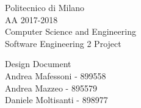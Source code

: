
\usepackage{graphicx}
\usepackage{listings}
\usepackage{algpseudocode}
\renewcommand\textfraction{.1}
\usepackage{booktabs}

	
	
	\begin{titlepage}
		
		\begin{figure}[t]
			\centering
		\end{figure}
		\begin{center}
			Politecnico di Milano\\AA 2017-2018\\
			\vspace{7mm}
			Computer Science and Engineering\\
			\huge Software Engineering 2 Project
		\end{center}
		
		\begin{figure}[!h]
			\centering
		\end{figure}
		
		\begin{center}
			\fontsize{7mm}{10mm}\selectfont Design Document \\
			\vspace{7mm}
			\small Andrea Mafessoni - 899558\\
			Andrea Mazzeo - 895579\\
			Daniele Moltisanti - 898977
		\end{center}
		
	\end{titlepage}
	
